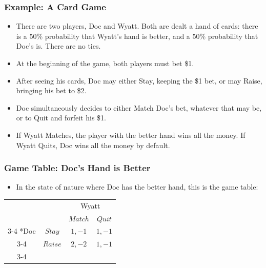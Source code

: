 
\begin{frame}
\frametitle{Example: A Card Game}
\begin{itemize}
\item There are two players, Doc and Wyatt. Both are dealt a hand of cards:
  there is a 50\% probability that Wyatt's hand is better,
  and a 50\% probability that Doc's is. 
  There are no ties.
\item At the beginning of the game, both players must bet \$1. 
\item After seeing his cards, Doc may either Stay, keeping the \$1 bet, or may Raise, bringing his bet to \$2.
\item Doc simultaneously decides to either Match Doc's bet, whatever that may be, or to Quit and forfeit his \$1.
\item If Wyatt Matches, the player with the better hand wins all the money. If Wyatt Quits, Doc wins all the money by default.
\end{itemize}
\end{frame}


\begin{frame}
\frametitle{Game Table: Doc's Hand is Better}
\begin{itemize}
\item In the state of nature where Doc has the better hand, this is the game table:
\end{itemize}
\begin{table}[h]
\centering

\begin{tabular}{cc|c|c|}
& \multicolumn{1}{c}{} & \multicolumn{2}{c}{Wyatt}\\
& \multicolumn{1}{c}{} & \multicolumn{1}{c}{$Match$}  & \multicolumn{1}{c}{$Quit$} \\\cline{3-4}
\multirow{2}*{Doc}  & $Stay$ & $1, -1$ & $1, -1$ \\\cline{3-4}
& $Raise$ & $2, -2$ & $1,-1$ \\\cline{3-4}
\end{tabular}
\end{table}
\end{frame}


